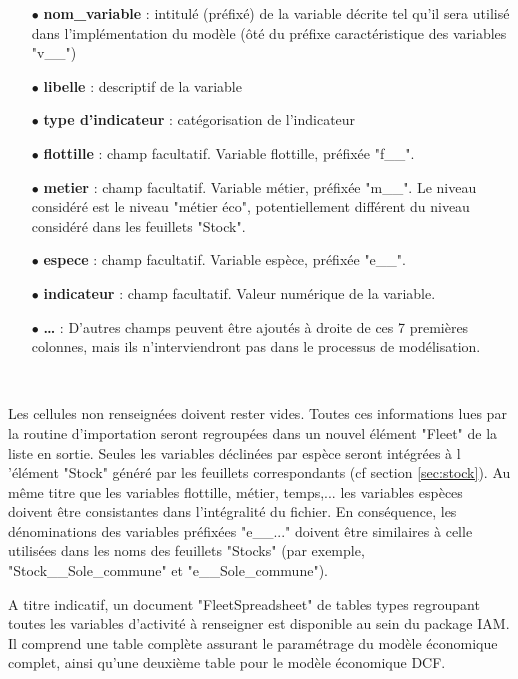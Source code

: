 \documentclass[12pt, colorinlistoftodos, notitlepage]{report}
\newenvironment{not used}[1]{%
    \longtable{%
        |>{\centering$\displaystyle}A{#1}{1}<{$}%
        |}\hline\ignorespaces}{%
    \endlongtable\ignorespacesafterend}
\begin{document}
\begin{itemize}
    \item[$\bullet$] \textbf{nom\_variable} : intitulé (préfixé) de la variable décrite tel qu'il sera utilisé dans l'implémentation du modèle (ôté du préfixe caractéristique des variables "v\_\_")
    \item[$\bullet$] \textbf{libelle} : descriptif de la variable
    \item[$\bullet$] \textbf{type d'indicateur} : catégorisation de l'indicateur
    \item[$\bullet$] \textbf{flottille} : champ facultatif. Variable flottille, préfixée "f\_\_".
    \item[$\bullet$] \textbf{metier} : champ facultatif. Variable métier, préfixée "m\_\_". Le niveau considéré est le niveau "métier éco", potentiellement différent du niveau considéré dans les feuillets "Stock".
    \item[$\bullet$] \textbf{espece} : champ facultatif. Variable espèce, préfixée "e\_\_".
    \item[$\bullet$] \textbf{indicateur} : champ facultatif. Valeur numérique de la variable.
    \item[$\bullet$] \textbf{…} : D'autres champs peuvent être ajoutés à droite de ces 7 premières colonnes, mais ils n'interviendront pas dans le processus de modélisation.
\end{itemize}

\par~\par

Les cellules non renseignées doivent rester vides. Toutes ces informations lues par la routine d'importation seront regroupées dans un nouvel élément "Fleet" de la liste en sortie. Seules les variables déclinées par espèce seront intégrées à l 'élément "Stock" généré par les feuillets correspondants (cf section \ref{sec:stock}). Au même titre que les variables flottille, métier, temps,... les variables espèces doivent être consistantes dans l'intégralité du fichier. En conséquence, les dénominations des variables préfixées "e\_\_..." doivent être similaires à celle utilisées dans les noms des feuillets "Stocks" (par exemple, "Stock\_\_Sole\_commune" et "e\_\_Sole\_commune").

A titre indicatif, un document "FleetSpreadsheet" de tables types regroupant toutes les variables d'activité à renseigner est disponible au sein du package IAM. Il comprend une table complète assurant le paramétrage du modèle économique complet, ainsi qu'une deuxième table pour le modèle économique DCF.
\end{document}
